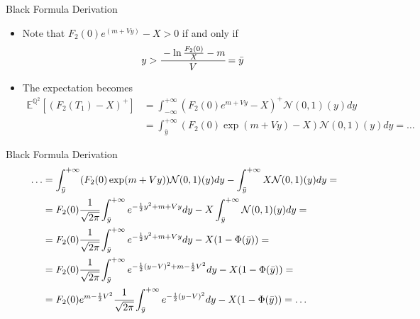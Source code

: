 \documentclass{beamer}
\begin{document}
\begin{frame}{Black Formula Derivation}
\begin{itemize}
\item Note that $F_2(0)e^{(m + Vy)} - X > 0$ if and only if
\begin{equation*}
y > \cfrac{-\ln\frac{F_2(0)}{X}-m}{V} = \bar{y}
\end{equation*}
\item The expectation becomes
\begin{equation*}
\begin{aligned}
\mathbb{E}^{\mathbb{Q}^2}[(F_2(T_1) - X)^+] &= \int_{-\infty}^{+\infty}
(F_2(0)e^{m+Vy}-X)^+\mathcal{N}(0,1)(y)dy\\
&=\int_{\bar{y}}^{+\infty}(F_2(0)\exp(m+Vy)-X)\mathcal{N}(0,1)(y)dy =\ldots
\end{aligned}
\end{equation*}
\end{itemize}
\end{frame}

\begin{frame}{Black Formula Derivation}
\begin{equation*}
\begin{aligned}
\ldots &= 
\int_{\bar{y}}^{+\infty}(F_2(0)\exp(m+Vy))\mathcal{N}(0,1)(y)dy - \int_{\bar{y}}^{+\infty}X \mathcal{N}(0,1)(y)dy = \\
&=F_2(0)\cfrac{1}{\sqrt{2\pi}}\int_{\bar{y}}^{+\infty}e^{-\frac{1}{2}y^2+m+Vy}dy-X\int_{\bar{y}}^{+\infty}\mathcal{N}(0,1)(y)dy = \\
&=F_2(0)\cfrac{1}{\sqrt{2\pi}}\int_{\bar{y}}^{+\infty}e^{-\frac{1}{2}y^2+m+Vy}dy-X(1-\Phi(\bar{y})) = \\
&= F_2(0)\cfrac{1}{\sqrt{2\pi}}\int_{\bar{y}}^{+\infty}e^{-\frac{1}{2}(y-V)^2 +m-\frac{1}{2}V^2}dy-X(1-\Phi(\bar{y})) = \\
&=F_2(0)e^{m-\frac{1}{2}V^2}\cfrac{1}{\sqrt{2\pi}}\int_{\bar{y}}^{+\infty}e^{-\frac{1}{2}(y-V)^2}dy-X(1-\Phi(\bar{y})) =\ldots\\
\end{aligned}
\end{equation*}
\end{frame}
\end{document}
